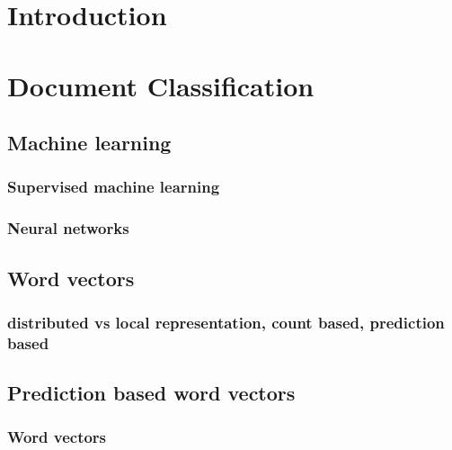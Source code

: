 \chapter*{Introduction}


\chapter{Document Classification}

    \section{Machine learning}
        \subsection{Supervised machine learning}
        \cite{Goodfellow-et-al-2016} %
        \cite{rumelhart1986david} %
        \cite{bottou-bousquet-2008} %
        \subsection{Neural networks}
        
        
    \section{Word vectors}
        \subsection{distributed vs local representation, count based, prediction based}
        \cite{Rubenstein:1965:CCS:365628.365657} %
        \cite{maas2011learning} %

    \section{Prediction based word vectors}
        \subsection{Word vectors}
        \cite{DBLP:journals/corr/MikolovSCCD13} %
        \cite{DBLP:conf/icml/LeM14} %
        \cite{rong2014word2vec} %
        \cite{pennington2014glove} %


